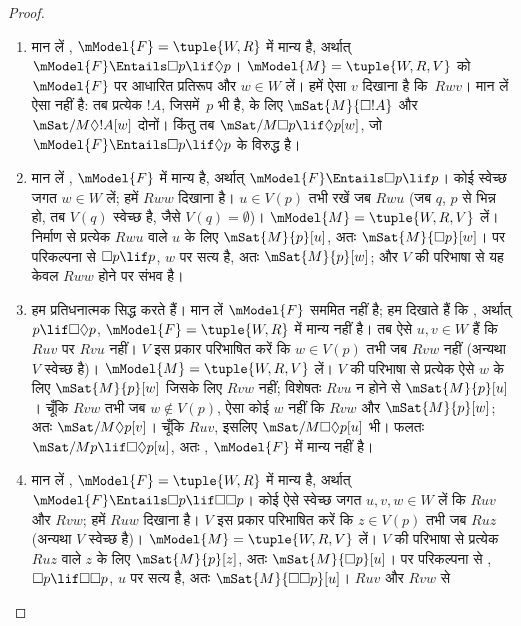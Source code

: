 \documentclass[../../../include/open-logic-section]{subfiles}
\begin{document}
\begin{proof}
  \begin{enumerate}
  \item मान लें , $\mModel{F} = \tuple{W, R}$ में मान्य है, अर्थात्
    $\mModel{F} \Entails \Box p \lif \Diamond p$। $\mModel{M} =
    \tuple{W, R, V}$ को $\mModel{F}$ पर आधारित प्रतिरूप और $w \in W$ लें।
    हमें ऐसा $v$ दिखाना है कि~$Rwv$। मान लें ऐसा नहीं है: तब प्रत्येक
    $!A$, जिसमें~$p$ भी है, के लिए $\mSat{M}{\Box !A}$ और
    $\mSat/{M}{\Diamond !A}[w]$ दोनों। किंतु तब
    $\mSat/{M}{\Box p \lif \Diamond p}[w]$, जो
    $\mModel{F} \Entails \Box p \lif \Diamond p$ के विरुद्ध है।
  \item मान लें , $\mModel{F}$ में मान्य है, अर्थात्
    $\mModel{F} \Entails \Box p \lif p$। कोई स्वेच्छ जगत $w \in W$ लें;
    हमें $Rww$ दिखाना है। $u \in V(p)$ तभी रखें जब $Rwu$ (जब $q$, $p$ से
    भिन्न हो, तब $V(q)$ स्वेच्छ है, जैसे $V(q) = \emptyset$)।
    $\mModel{M} = \tuple{W, R, V}$ लें। निर्माण से प्रत्येक $Rwu$ वाले $u$
    के लिए $\mSat{M}{p}[u]$, अतः $\mSat{M}{\Box p}[w]$। पर परिकल्पना से
    $\Box p \lif p$, $w$ पर सत्य है, अतः $\mSat{M}{p}[w]$; और $V$ की
    परिभाषा से यह केवल $Rww$ होने पर संभव है।
  \item हम प्रतिधनात्मक सिद्ध करते हैं। मान लें $\mModel{F}$ सममित नहीं है;
    हम दिखाते हैं कि , अर्थात् $p \lif \Box\Diamond p$,
    $\mModel{F}= \tuple{W, R}$ में मान्य नहीं है। तब ऐसे $u,v \in W$ हैं
    कि $Ruv$ पर $Rvu$ नहीं। $V$ इस प्रकार परिभाषित करें कि $w \in V(p)$
    तभी जब $Rvw$ नहीं (अन्यथा $V$ स्वेच्छ है)।
    $\mModel{M} =\tuple{W, R,V}$ लें। $V$ की परिभाषा से प्रत्येक ऐसे $w$ के
    लिए $\mSat{M}{p}[w]$ जिसके लिए $Rvw$ नहीं; विशेषतः $Rvu$ न होने से
    $\mSat{M}{p}[u]$। चूँकि $Rvw$ तभी जब $w \notin V(p)$, ऐसा कोई $w$ नहीं
    कि $Rvw$ और $\mSat{M}{p}[w]$; अतः $\mSat/{M}{\Diamond p}[v]$। चूँकि
    $Ruv$, इसलिए $\mSat/{M}{\Box\Diamond p}[u]$ भी। फलतः
    $\mSat/{M}{p \lif \Box\Diamond p}[u]$, अतः , $\mModel{F}$ में
    मान्य नहीं है।
  \item मान लें , $\mModel{F} = \tuple{W,R}$ में मान्य है, अर्थात्
    $\mModel{F} \Entails \Box p \lif \Box\Box p$। कोई ऐसे स्वेच्छ जगत
    $u,v,w \in W$ लें कि $Ruv$ और $Rvw$; हमें $Ruw$ दिखाना है। $V$ इस
    प्रकार परिभाषित करें कि $z \in V(p)$ तभी जब $Ruz$ (अन्यथा $V$ स्वेच्छ
    है)। $\mModel{M} =\tuple{W, R, V}$ लें। $V$ की परिभाषा से प्रत्येक
    $Ruz$ वाले $z$ के लिए $\mSat{M}{p}[z]$, अतः $\mSat{M}{\Box p}[u]$।
    पर परिकल्पना से , $\Box p \lif \Box \Box p$, $u$ पर सत्य है,
    अतः $\mSat{M}{\Box \Box p}[u]$। $Ruv$ और $Rvw$ से

\end{enumerate}
\end{proof}
\end{document}
